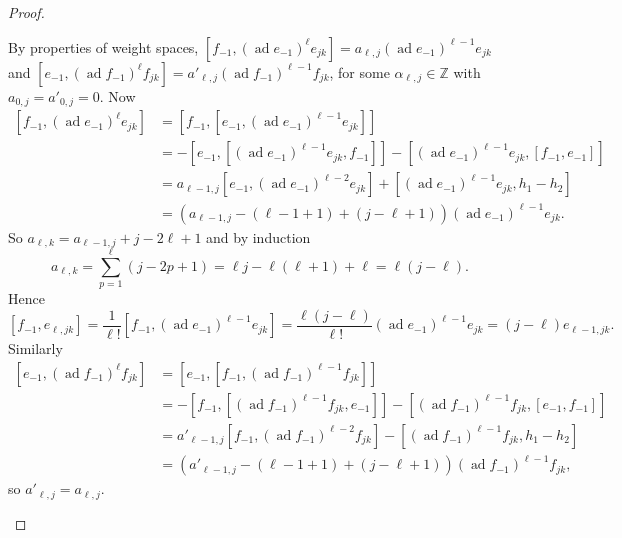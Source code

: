 \documentclass[11pt,letterpaper]{amsart}
\numberwithin{thecounter}{section}
\theoremstyle{definition}
\DeclareMathOperator{\ad}{ad}
\renewcommand{\a}{\alpha}
\newcommand{\Z}{{\mathbb Z}}
\begin{document}
\begin{proof}
\begin{longver}
By properties of weight spaces,  $\left[f_{-1}, \left(\ad e_{-1} \right)^\ell e_{jk} \right]= a_{\ell, j}\left(\ad e_{-1} \right)^{\ell-1} e_{jk}$ and $\left[e_{-1}, \left(\ad f_{-1} \right)^\ell f_{jk} \right]= a'_{\ell, j}\left(\ad f_{-1} \right)^{\ell-1} f_{jk}$, for some $\a_{\ell,j}\in\Z$
with $a_{0,j}=a'_{0,j}=0$. Now
\begin{align*}
 \left[f_{-1}, \left(\ad e_{-1} \right)^\ell e_{jk} \right] &=  \left[f_{-1}, \left[e_{-1},\left(\ad e_{-1} \right)^{\ell-1} e_{jk} \right] \right]\\
 &=- \left[e_{-1},\left[\left(\ad e_{-1} \right)^{\ell-1} e_{jk},f_{-1} \right] \right] - \left[\left(\ad e_{-1} \right)^{\ell-1} e_{jk}, \left[f_{-1},e_{-1} \right] \right]\\
 &= a_{\ell-1,j}\left[e_{-1},\left(\ad e_{-1}\right)^{\ell-2} e_{jk} \right]  + \left[\left(\ad e_{-1} \right)^{\ell-1} e_{jk}, h_1-h_2 \right]\\
 &=\left(a_{\ell-1,j} -(\ell-1+1) +(j-\ell+1)\right)\left(\ad e_{-1} \right)^{\ell-1} e_{jk}.
\end{align*}
So $a_{\ell, k} = a_{\ell-1,j} +j-2\ell+1$ and by induction
$$ a_{\ell,k} = \sum_{p=1}^\ell(j-2p+1)  = \ell j -\ell(\ell+1)+\ell = \ell(j-\ell).$$
Hence
$$\left[f_{-1}, e_{\ell,jk} \right] = \frac{1}{\ell!} \left[f_{-1}, \left(\ad e_{-1} \right)^{\ell-1} e_{jk} \right] =  \frac{\ell(j-\ell)}{\ell!} \left(\ad e_{-1} \right)^{\ell-1} e_{jk}= (j-\ell)e_{\ell-1,jk}.$$
Similarly
\begin{align*}
 \left[e_{-1},\left(\ad f_{-1} \right)^\ell f_{jk} \right] &=  \left[e_{-1}, \left[f_{-1},\left(\ad f_{-1} \right)^{\ell-1} f_{jk} \right] \right]\\
 &=- \left[f_{-1},\left[\left(\ad f_{-1}\right)^{\ell-1} f_{jk},e_{-1} \right] \right] - \left[\left(\ad f_{-1} \right)^{\ell-1} f_{jk}, \left[e_{-1},f_{-1} \right] \right]\\
 &= a'_{\ell-1,j}\left[f_{-1},\left(\ad f_{-1} \right)^{\ell-2} f_{jk} \right]  - \left[\left(\ad f_{-1} \right)^{\ell-1} f_{jk}, h_1-h_2 \right]\\
 &=\left(a'_{\ell-1,j} -(\ell-1+1)+(j-\ell+1)\right)\left(\ad f_{-1} \right)^{\ell-1} f_{jk},
\end{align*}
so $a'_{\ell,j}=a_{\ell,j}$.


\end{longver}
\end{proof}
\end{document}
